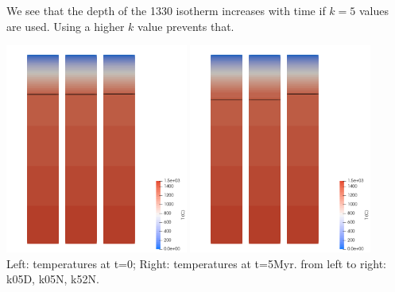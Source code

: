 We see that the depth of the 1330 isotherm increases with time if $k=5$ values are used.
Using a higher $k$ value prevents that.

\begin{center}
\includegraphics[width=6cm]{python_codes/fieldstone_141/results/test0/temps_0Myr}
\includegraphics[width=6cm]{python_codes/fieldstone_141/results/test0/temps_5Myr}\\
{\captionfont Left: temperatures at t=0; Right: temperatures at t=5Myr. 
from left to right: k05D, k05N, k52N.}
\end{center}







